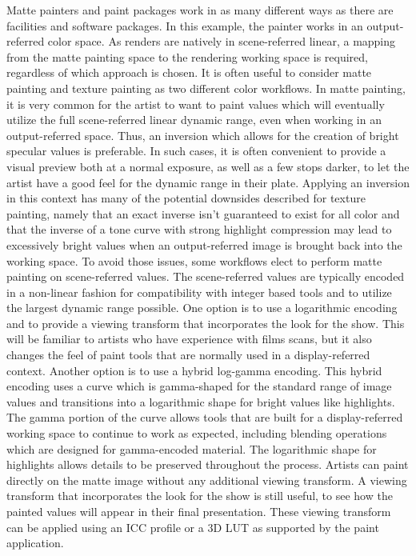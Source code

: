 Matte painters and paint packages work in as many different ways as there are facilities and software packages. In this example, the painter works in an output-referred color space. As renders are natively in scene-referred linear, a mapping from the matte painting space to the rendering working space is required, regardless of which approach is chosen.
It is often useful to consider matte painting and texture painting as two different color workflows. In matte painting, it is very common for the artist to want to paint values which will eventually utilize the full scene-referred linear dynamic range, even when working in an output-referred space. Thus, an inversion which allows for the creation of bright specular values is preferable. In such cases, it is often convenient to provide a visual preview both at a normal exposure, as well as a few stops darker, to let the artist have a good feel for the dynamic range in their plate. Applying an inversion in this context has many of the potential downsides described for texture painting, namely that an exact inverse isn’t guaranteed to exist for all color and that the inverse of a tone curve with strong highlight compression may lead to excessively bright values when an output-referred image is brought back into the working space.
To avoid those issues, some workflows elect to perform matte painting on scene-referred values. The scene-referred values are typically encoded in a non-linear fashion for compatibility with integer based tools and to utilize the largest dynamic range possible. One option is to use a logarithmic encoding and to provide a viewing transform that incorporates the look for the show. This will be familiar to artists who have experience with films scans, but it also changes the feel of paint tools that are normally used in a display-referred context. Another option is to use a hybrid log-gamma encoding. This hybrid encoding uses a curve which is gamma-shaped for the standard range of image values and transitions into a logarithmic shape for bright values like highlights. The gamma portion of the curve allows tools that are built for a display-referred working space to continue to work as expected, including blending operations which are designed for gamma-encoded material. The logarithmic shape for highlights allows details to be preserved throughout the process. Artists can paint directly on the matte image without any additional viewing transform. A viewing transform that incorporates the look for the show is still useful, to see how the painted values will appear in their final presentation. These viewing transform can be applied using an ICC profile or a 3D LUT as supported by the paint application.

